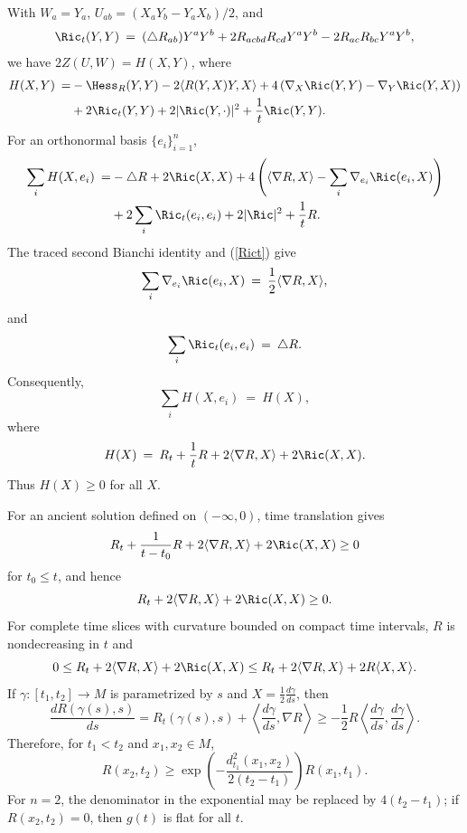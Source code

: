 With $W_a=Y_a$, $U_{ab}=(X_aY_b-Y_aX_b)/2$, and
\begin{equation} \label{Rict}
\Ric_t(Y,Y)\:=\:(\triangle R_{ab})Y^aY^b+2R_{acbd}R_{cd}Y^aY^b
-2R_{ac}R_{bc}Y^aY^b,
\end{equation}
we have $2Z(U,W)=H(X,Y)$, where
\begin{align} \label{Hexpression}
H(X,Y)\: = & -\Hess_R(Y,Y)-2\langle R(Y,X)Y,X\rangle
+4\left(\nabla_X\Ric(Y,Y)-\nabla_Y\Ric(Y,X)\right)\\
&+2\Ric_t(Y,Y)+2|\Ric(Y,\cdot)|^2+\frac1t\Ric(Y,Y). \notag
\end{align}
For an orthonormal basis $\{e_i\}_{i=1}^n$,
\begin{align}
\sum_iH(X,e_i)\: = & -\triangle R+2\Ric(X,X)
+4\left(\langle\nabla R,X\rangle-\sum_i\nabla_{e_i}\Ric(e_i,X)\right)\\
&+2\sum_i\Ric_t(e_i,e_i)+2|\Ric|^2+\frac1tR. \notag
\end{align}
The traced second Bianchi identity and (\ref{Rict}) give
\begin{equation}
\sum_i\nabla_{e_i}\Ric(e_i,X)\:=\:\frac12\langle\nabla R,X\rangle,
\end{equation}
and
\begin{equation}
\sum_i\Ric_t(e_i,e_i)\:=\:\triangle R.
\end{equation}
Consequently,
\begin{equation} \label{together}
\sum_iH(X,e_i)\:=\:H(X),
\end{equation}
where
\begin{equation} \label{Heqn}
H(X)\:=\:R_t+\frac1tR+2\langle\nabla R,X\rangle+2\Ric(X,X).
\end{equation}
Thus $H(X)\geq0$ for all $X$.

For an ancient solution defined on $(-\infty,0)$, time translation gives
\begin{equation}
R_t+\frac1{t-t_0}R+2\langle\nabla R,X\rangle+2\Ric(X,X)\geq0
\end{equation}
for $t_0\leq t$, and hence
\begin{equation}
R_t+2\langle\nabla R,X\rangle+2\Ric(X,X)\geq0.
\end{equation}
For complete time slices with curvature bounded on compact time intervals,
$R$ is nondecreasing in $t$ and
\begin{equation}
0\leq R_t+2\langle\nabla R,X\rangle+2\Ric(X,X)
\leq R_t+2\langle\nabla R,X\rangle+2R\langle X,X\rangle.
\end{equation}
If $\gamma:[t_1,t_2]\rightarrow M$ is parametrized by $s$ and
$X=\frac12\frac{d\gamma}{ds}$, then
\begin{equation}
\frac{dR(\gamma(s),s)}{ds}=R_t(\gamma(s),s)
+\left\langle\frac{d\gamma}{ds},\nabla R\right\rangle
\geq-\frac12R\left\langle\frac{d\gamma}{ds},\frac{d\gamma}{ds}\right\rangle.
\end{equation}
Therefore, for $t_1<t_2$ and $x_1,x_2\in M$,
\begin{equation}
\label{harnackinequality}
R(x_2,t_2)\geq
\exp\left(-\frac{d_{t_1}^2(x_1,x_2)}{2(t_2-t_1)}\right)R(x_1,t_1).
\end{equation}
For $n=2$, the denominator in the exponential may be replaced by
$4(t_2-t_1)$; if $R(x_2,t_2)=0$, then $g(t)$ is flat for all $t$.

